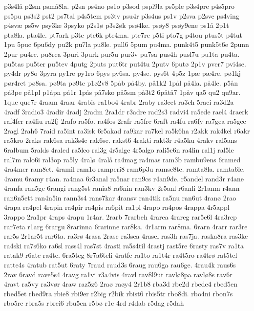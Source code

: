 {p3s4l^^e5
p2sm
psm^^e58la.
p2sn
ps4no
ps1o
p3sod
pspi9la
ps5ple
p3s4pre
p4s5pro
ps5pu
ps3s2
pst2
ps7tal
p4s5tem
ps3tv
psu4r
p3s4us
ps1v
p2sva
p2sve
ps4ving
p4sv^^e6
ps5w
psy3ke
3psyko
p2s1^^f8
p3s2^^f8k
ps^^f84ke.
ps^^f8y8
ps^^f8y9ene
ps1^^e5
2p1t
pta8la.
pta4le.
pt7ark
p3te
pte6k
pte4ma.
pte7re
p5ti
pto7g
p4tou
ptus5t
p4tut
1pu
5puc
6pu6dy
pu2k
pu7la
pu8le.
pull6
5pum
pu4ma.
punk4t5
punk5t6e
2punn
2pur
pu4re.
pu8rea
3puri
3purk
pur5u
pur3v
pu7sa
pus4h
pusl7u
pu1ta
pu4ta.
pu5tas
pu5ter
pu5tev
4putg
2puts
put6tr
put4tu
2putv
6put^^f8
2p1v
pver7
pvi4se.
py4dr
py8o
3pyra
py1re
py1ro
6pys
py6sa.
py4se.
pys6t
4p5z
1p^^e6
p^^e64re.
p^^f81kj
p^^f8r4ret
p^^f88sa.
p^^f89ta
p^^f89te
p1^^f82v8
5p^^e5b
p^^e54by.
p^^e51k2
1p^^e5l
p^^e54la.
p^^e54le.
p5^^e5n
p^^e53pe
p^^e51pl
p1^^e5pn
p^^e51r
1p^^e5s
p^^e57sko
p^^e55sm
p^^e53t2
6p^^e5t^^e57
1p^^e5v
qa5
qu2
qu9ar.
1que
que7r
4raam
4raar
4rabis
ra1bo4
4rabr
2raby
ra3cet
ra3ch
5raci
ra3d2a
4radf
3radio3
4radir
4radj
2radm
2ra1dr
r3adre
rad2s3
radvi4
ra5ede
rael4
4raerk
raf4fer
ra4fiu
ra2fj
2rafo
ra5fo.
ra4fos
2rafr
ra5fre
6raft
ra4fu
ra6fy
ra7gea
ra5gee
2ragl
2rah6
7raid
ra5int
ra3isk
6r5akad
ra9kar
ra7kel
ra5k6ha
r2akk
rak4kel
r6akr
ra5kro
2raks
rak6sa
rak3s4e
rak6se.
rakst6
4rakti
rakt3r
r4a5ku
4rakv
ral5ans
6ralbum
5ralds
4raled
ra5leo
ral3g
4r5alge
4r5algo
rali5e6n
ra4lin
ral1j
ral5le
ral7m
ralo6i
ral3op
ra5ly
4ral^^f8
4ral^^e5
ra4mag
ra4mas
ram3b
rambu9ens
6ramed
4ra4mer
ram8et.
4ramil
ram1o
ramperi8
ram6p3u
ramse8te.
ramta8la.
ramta6le.
4ramu
6ramy
r4an.
ra4naa
6r3anal
ra5nar
ran9cs
r4an9de.
r5andel
rand3r
r4ane
4ranfa
ran5ge
6rangi
rang5st
rania8
ra6nin
ran3kv
2r5anl
r6anli
2r1anm
r4ann
ran6n5ett
ran4n5in
rann3s4
rans7kar
4ransv
ran4tik
ra5nu
ran6ut
4ran^^f8
2rao
4rapa
ra4pel
4rapin
ra4pir
ra4pis
ra6pit
ra1pl
4rapo
ra4pos
4rappa
4r5appl
3rappo
2ra1pr
4raps
4rapu
1r4ar.
2rarb
7rarbeh
4rarea
4rareg
rar5e6l
4ra3rep
rar7eta
r1arg
6rargu
8rarinna
6rarinne
rar8ka.
4r1arm
rar8ma.
6rarn
4rarr
rar3re
rar5s
2r1ar5t
rar6ta.
ra3r^^f8
4rasa
2rasc
ra3sea
4rasel
ras3h
ras7ja.
raska8ra
ras3ke
ra4ski
ra7s6ko
ra6sl
rass4l
ras7st
4rasti
ra5s4til
4rastj
rast5re
6rasty
ras7v
ra1ta
ratak9
r6ate
ra4te.
6ra5teg
8r7a6teli
4ratfe
ra1to
ra1t4r
ra4t5ro
ra4tr^^f8
rat5tel
ratte4s
4ratub
rat5ut
6raty
7raud
raud3s
6raug
rau6ga
rau6ge.
4rau4k
raus6s
2rav
6ravd
rave5s4
4ravg
ra1vi
r3a4vis
4ravl
rav8l9ut
ravl^^f88pa
ravl^^f88s
rav6r
4ravt
ra5vy
ra3v^^f8r
4raw
raz5z6
2ra^^f8
ra^^f8y4
2r1b8
rba3d
rbe2d
rbede4
rbed5en
rbed5et
rbed9ra
rbie8
rbi9er
r2big
r2bik
rbist6
rbis5tr
rbo8di.
rbo4ni
rbon7s
rbo5re
rbra5s
rbrei6
rbu5en
r5b^^f8
r1c
4rd
r4dab
r5dag
r5dah
}
